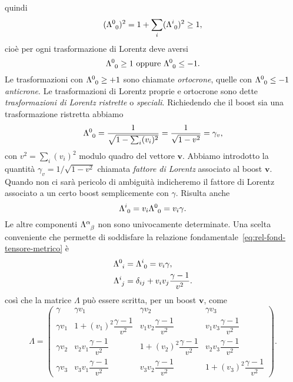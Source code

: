 quindi
\begin{equation}
  (\tensor{\Lambda}{^{0}_{0}})^{2} = 1 +
  \sum_{i}(\tensor{\Lambda}{^{i}_{0}})^{2} \geq 1,
\end{equation}
cioè per ogni trasformazione di Lorentz deve aversi
\begin{equation}
  \tensor{\Lambda}{^{0}_{0}} \geq 1 \text{ oppure } \tensor{\Lambda}{^{0}_{0}}
  \leq -1.
\end{equation}
Le trasformazioni con $\tensor{\Lambda}{^{0}_{0}} \geq +1$ sono chiamate
\emph{ortocrone}, quelle con $\tensor{\Lambda}{^{0}_{0}} \leq -1$
\emph{anticrone}.  Le trasformazioni di Lorentz proprie e ortocrone sono dette
\emph{trasformazioni di Lorentz ristrette} o \emph{speciali}.  Richiedendo che
il boost sia una trasformazione ristretta abbiamo
\begin{equation}
  \tensor{\Lambda}{^{0}_{0}} = \frac{1}{\sqrt{1-\sum_{i}(v_{i})^{2}}} =
  \frac{1}{\sqrt{1-v^{2}}} = \gamma_{v},
\end{equation}
con $v^{2} = \sum_{i}(v_{i})^{2}$ modulo quadro del vettore $\bm{v}$.  Abbiamo
introdotto la quantità $\gamma_{v} = 1/\sqrt{1-v^{2}}$ chiamata
\emph{fattore di Lorentz} associato al boost $\bm{v}$.
Quando non ci sarà pericolo di ambiguità indicheremo il fattore di Lorentz
associato a un certo boost semplicemente con $\gamma$.  Risulta anche
\begin{equation}
  \tensor{\Lambda}{^{i}_{0}} = v_{i}\tensor{\Lambda}{^{0}_{0}} = v_{i}\gamma.
\end{equation}
Le altre componenti $\tensor{\Lambda}{^{\alpha}_{\beta}}$ non sono univocamente
determinate.  Una scelta conveniente che permette di soddisfare
la relazione fondamentale~\eqref{eq:rel-fond-tensore-metrico} è
\begin{subequations}
  \begin{align}
    \tensor{\Lambda}{^{0}_{i}} &= \tensor{\Lambda}{^{i}_{0}} = v_{i}\gamma, \\
    \tensor{\Lambda}{^{i}_{j}} &= \delta_{ij} +
    v_{i}v_{j}\frac{\gamma-1}{v^{2}}.
  \end{align}
\end{subequations}
così che la matrice $\Lambda$ può essere scritta, per un boost
$\bm{v}$, come
\begin{equation}
  \Lambda =
  \begin{pmatrix}
    \gamma & \gamma v_{1} & \gamma v_{2} & \gamma v_{3} \\[2.0ex]
    \gamma v_{1} & 1 + (v_{1})^{2}\dfrac{\gamma-1}{v^{2}} &
    v_{1}v_{2}\dfrac{\gamma-1}{v^{2}} & v_{1} v_{3}\dfrac{\gamma-1}{v^{2}}
    \\[2.0ex]
    \gamma v_{2} & v_{2}v_{1}\dfrac{\gamma-1}{v^{2}} & 1 +
    (v_{2})^{2}\dfrac{\gamma-1}{v^{2}} & v_{2}v_{3}\dfrac{\gamma-1}{v^{2}}
    \\[2.0ex]
    \gamma v_{3} & v_{3}v_{1}\dfrac{\gamma-1}{v^{2}} &
    v_{3}v_{2}\dfrac{\gamma-1}{v^{2}} & 1 + (v_{3})^{2}\dfrac{\gamma-1}{v^{2}}
  \end{pmatrix}.
\end{equation}

